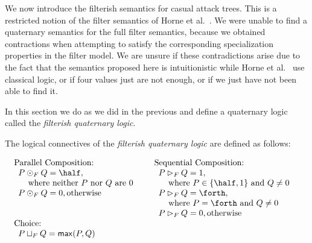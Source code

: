 We now introduce the filterish semantics for casual attack trees.
This is a restricted notion of the filter semantics of Horne et
al.~\cite{horne2017semantics}.  We were unable to find a quaternary
semantics for the full filter semantics, because we obtained
contractions when attempting to satisfy the corresponding
specialization properties in the filter model.  We are unsure if these
contradictions arise due to the fact that the semantics proposed here
is intuitionistic while Horne et al.~\cite{horne2017semantics} use
classical logic, or if four values just are not enough, or if we just
have not been able to find it.

In this section we do as we did in the previous and define a
quaternary logic called the \emph{filterish quaternary logic}.
\begin{definition}
  \label{def:filterish-semantics}
  The logical connectives of the \emph{filterish quaternary logic} are
  defined as follows:\vspace{-5px}
  \begin{center}
    \begin{math}
      \setlength{\arraycolsep}{5px}
      \begin{array}{lll}
        \begin{array}{lll}
          \text{Parallel Composition:}\\
          \begin{array}{lll}
            P \odot_F Q = \half,\\
            \,\,\,\,\,\,\,\text{where neither $P$ nor $Q$ are $0$}\\
            P \odot_F Q = 0, \text{otherwise}\\\\\\
          \end{array}
        \end{array}
        &
        \begin{array}{lll}
          \text{Sequential Composition:}\\
          \begin{array}{lll}          
            P \rhd_F Q = 1,\\
            \,\,\,\,\,\,\,\text{where } P \in \{\half, 1\} \text{ and } Q \neq 0\\
            P \rhd_F Q = \forth,\\
            \,\,\,\,\,\,\,\text{where } P = \forth  \text{ and } Q \neq 0\\
            P \rhd_F Q = 0, \text{otherwise}
          \end{array}
        \end{array}
        \\[30px]
        \begin{array}{lll}
          \text{Choice:}\\    
          \begin{array}{lll}
            P \sqcup_F Q = \mathsf{max}(P,Q)
          \end{array}
        \end{array}
      \end{array}
    \end{math}
  \end{center}        
\end{definition}
